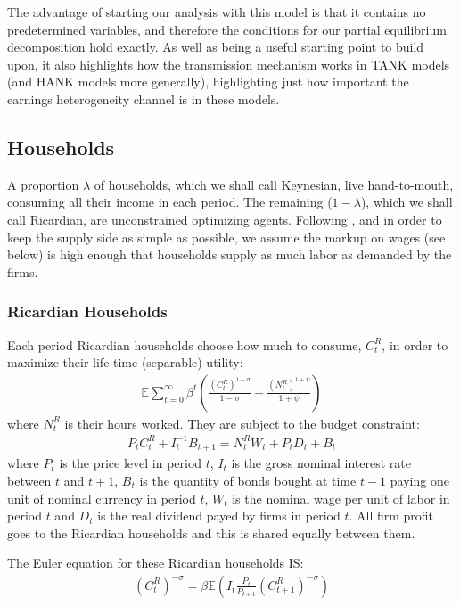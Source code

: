 \documentclass[titlepage]{\econtex}\newcommand{\texname}{ConsumptionHeterogeneity}
\begin{document}
The advantage of starting our analysis with this model is that it contains no predetermined variables, and therefore the conditions for our partial equilibrium decomposition hold exactly. As well as being a useful starting point to build upon, it also highlights how the transmission mechanism works in TANK models (and HANK models more generally), highlighting just how important the earnings heterogeneity channel is in these models.

\subsection{Households}
A proportion $\lambda$ of households, which we shall call Keynesian, live hand-to-mouth, consuming all their income in each period. The remaining ($1-\lambda$), which we shall call Ricardian, are unconstrained optimizing agents. Following \cite{dgHANKTANK}, and in order to keep the supply side as simple as possible, we assume the markup on wages (see below) is high enough that households supply as much labor as demanded by the firms.

\subsubsection{Ricardian Households}
Each period Ricardian households choose how much to consume, $C^R_t$, in order to maximize their life time (separable) utility:
\begin{align*}
\mathbb{E}\sum_{t=0}^{\infty}\beta^t \left(\frac{\left(C^R_t\right)^{1-\sigma}}{1-\sigma} - \frac{\left(N^R_t\right)^{1+\psi}}{1+\psi}\right)
\end{align*}
where $N^R_t$ is their hours worked. They are subject to the budget constraint:
\begin{align*}
P_t C^R_t + I_{t}^{-1}B_{t+1} =  N^R_t W_t + P_t D_t + B_t
\end{align*}
where $P_t$ is the price level in period $t$, $I_t$ is the gross nominal interest rate between $t$ and $t+1$, $B_t$ is the quantity of bonds bought at time $t-1$ paying one unit of nominal currency in period $t$, $W_t$ is the nominal wage per unit of labor in period $t$ and $D_t$ is the real dividend payed by firms in period $t$. All firm profit goes to the Ricardian households and this is shared equally between them.

The Euler equation for these Ricardian households IS:
\begin{align}
\left(C^R_t\right)^{-\sigma} = \beta \mathbb{E}\left(I_t\frac{P_{t}}{P_{t+1}} \left(C^R_{t+1}\right)^{-\sigma}\right)	\label{euler_R}
\end{align}
\end{document}
